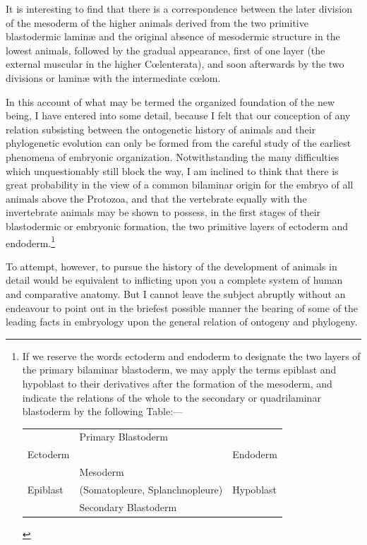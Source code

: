 \documentclass[a4paper, 11pt, oneside, english]{article}
\begin{document}
It is interesting to find that there is a correspondence between the later division of the mesoderm of the higher animals derived from the two primitive blastodermic laminæ and the original absence of mesodermic structure in the lowest animals, followed by the gradual appearance, first of one layer (the external muscular in the higher Cœlenterata), and soon afterwards by the two divisions or laminæ with the intermediate cœlom.

In this account of what may be termed the organized foundation of the new being, I have entered into some detail, because I felt that our conception of any relation subsisting between the ontogenetic history of animals and their phylogenetic evolution can only be formed from the careful study of the earliest phenomena of embryonic organization. Notwithstanding the many difficulties which unquestionably still block the way, I am inclined to think that there is great probability in the view of a common bilaminar origin for the embryo of all animals above the Protozoa, and that the vertebrate equally with the invertebrate animals may be shown to possess, in the first stages of their blastodermic or embryonic formation, the two primitive layers of ectoderm and endoderm.\footnote{If we reserve the words ectoderm and endoderm to designate the two layers of the primary bilaminar blastoderm, we may apply the terms epiblast and hypoblast to their derivatives after the formation of the mesoderm, and indicate the relations of the whole to the secondary or quadrilaminar blastoderm by the following Table:---\begin{table}[H]
    \tiny
    \begin{tabular}{l l l}
        ~ & Primary Blastoderm & ~ \\
        Ectoderm & ~ & Endoderm \\
        ~ & Mesoderm & ~ \\
        Epiblast & (Somatopleure, Splanchnopleure) & Hypoblast \\
        ~ & Secondary Blastoderm & ~ \\
    \end{tabular}
\end{table}}

To attempt, however, to pursue the history of the development of animals in detail would be equivalent to inflicting upon you a complete system of human and comparative anatomy. But I cannot leave the subject abruptly without an endeavour to point out in the briefest possible manner the bearing of some of the leading facts in embryology upon the general relation of ontogeny and phylogeny.
\end{document}
